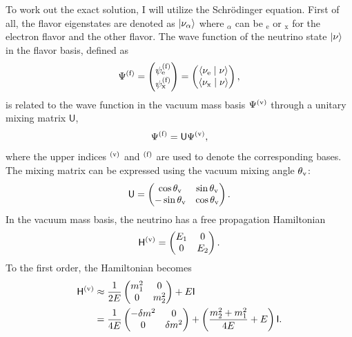 To work out the exact solution, I will utilize the Schr\"{o}dinger equation. First of all, the flavor eigenstates are denoted as $\left| \nu_\alpha\right\rangle$ where ${}_\alpha$ can be ${}_{\mathrm{e}}$ or ${}_{\mathrm{x}}$ for the electron flavor and the other flavor. The wave function of the neutrino state $\left| \nu\right\rangle$ in the flavor basis, defined as
\begin{equation}
    \Psi^{(\mathrm f)} = \begin{pmatrix}
        \psi^{(\mathrm f)}_{\mathrm e} \\
        \psi^{(\mathrm f)}_{\mathrm x}
    \end{pmatrix} = \begin{pmatrix}
        \langle \nu_{\mathrm e} \mid \nu \rangle \\
        \langle \nu_{\mathrm x} \mid \nu \rangle
    \end{pmatrix},
\end{equation}
is related to the wave function in the vacuum mass basis $\Psi^{(\mathrm v)}$ through a unitary mixing matrix $\mathsf U$,
\begin{equation}
\Psi^{(\mathrm f)} = \mathsf{U}\Psi^{(\vv)},
\label{chap:vacuum-eqn:wavefunction}
\end{equation}
where the upper indices ${}^{(\mathrm v)}$ and ${}^{(\mathrm f)}$ are used to denote the corresponding bases. The mixing matrix can be expressed using the vacuum mixing angle $\theta_{\mathrm v}$:
\begin{equation}
\mathsf{U} = \begin{pmatrix} \cos\theta_\mathrm v & \sin \theta_\mathrm v \\ -\sin \theta_\mathrm v & \cos \theta_\mathrm v \end{pmatrix}.
\end{equation}
In the vacuum mass basis, the neutrino has a free propagation Hamiltonian
\begin{equation}
\mathsf H^{(\mathrm v)} = \begin{pmatrix} E_1 & 0 \\
0 & E_2
\end{pmatrix}.
\end{equation}
To the first order, the Hamiltonian becomes
\begin{align}
\mathsf H^{(\mathrm v)} &\approx \frac{1}{2E} \begin{pmatrix}
m_1^2 & 0 \\
0 & m_2^2
\end{pmatrix} + E \mathsf{I} \nonumber \\
& =  \frac{1}{4E} \begin{pmatrix}
 - \delta m^2 & 0 \\
0 & \delta m^2
\end{pmatrix}  + \left(\frac{m_2^2 + m_1^2}{4E}  + E \right) \mathsf{I}.
\end{align}
